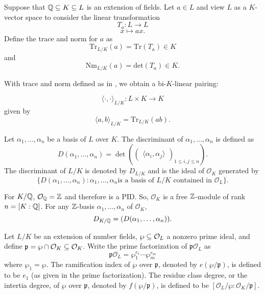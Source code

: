 
\begin{definition}
    Suppose that $\mathbb{Q} \subseteq K \subseteq L$ is an extension of fields. Let $a \in L$ and view $L$ as a $K$-vector space to consider the linear transformation
        \[T_a: L \to L\]
        \[x\mapsto ax. \]
    Define the trace and norm for $a$ as
        \[\textrm{Tr}_{L/K}(a) = \textrm{Tr}(T_a) \in K\]
    and
        \[\textrm{Nm}_{L/K}(a) = \textrm{det}(T_a) \in K.\]
\end{definition}

With trace and norm defined as in , we obtain a bi-$K$-linear pairing:

    \[\langle \cdot ,\cdot \rangle_{L/K}: L \times K \to K\]
given by
    \[\langle a, b\rangle_{L/K} = \textrm{Tr}_{L/K}(ab).\]
\begin{definition}
    Let $\alpha_1, \ldots, \alpha_n$ be a basis of $L$ over $K$. The discriminant of $\alpha_1, \ldots, \alpha_n$ is defined as
        \[D(\alpha_1, \ldots, \alpha_n) = \det\left(\begin{pmatrix}
            \langle \alpha_i, \alpha_j\rangle
        \end{pmatrix}_{1\leq i,j\leq n}\right).\]
    The discriminant of $L/K$ is denoted by $D_{L/K}$ and is the ideal of $\mathcal{O}_{K}$ generated by
        \[\{D(\alpha_1,\ldots, \alpha_n): \alpha_1, \ldots, \alpha_n \textrm{is a basis of $L/K$ contained in $\mathcal{O}_{L}$}\}.\]
\end{definition}


For $K/\mathbb{Q}$, $\mathcal{O}_{\mathbb{Q}} = \mathbb{Z}$ and therefore is a PID. So, $\mathcal{O}_{K}$ is a free $\mathbb{Z}$-module of rank $n = [K:\mathbb{Q}]$. For any $\mathbb{Z}$-basis $\alpha_1, \ldots, \alpha_n$ of $\mathcal{O}_{K}$,
    \[D_{K/\mathbb{Q}} = (D(\alpha_1, \ldots, \alpha_n)).\]

\begin{definition}
    Let $L/K$ be an extension of number fields, $\wp  \subseteq \mathcal{O}_{L}$ a nonzero prime ideal, and define $\mathfrak{p} = \wp \cap \mathcal{O}_{K} \subseteq \mathcal{O}_{K}$. Write the prime factorization of $\mathfrak{p}\mathcal{O}_{L}$ as
    \[\mathfrak{p}\mathcal{O}_{L} = \wp _1^{e_1}\cdots \wp _m^{e_m}\]
    where $\wp _1 = \wp $. The ramification index of $\wp $ over $\mathfrak{p}$, denoted by $e(\wp /\mathfrak{p})$, is defined to be $e_1$ (as given in the prime factorization). The residue class degree, or the intertia degree, of $\wp $ over $\mathfrak{p}$, denoted by $f(\wp /\mathfrak{p})$, is defined to be $[\mathcal{O}_{L}/\wp : \mathcal{O}_{K}/\mathfrak{p}]$.
\end{definition}


